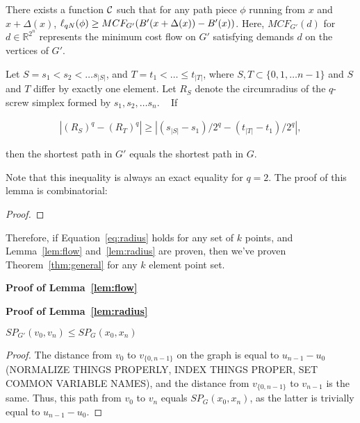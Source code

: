 
\begin{lemma}\label{lem:flow} There exists a function $\mathcal{C}$ such that for
any
path piece $\phi$ running from $x$ and $x+\Delta(x)$, $\ell_{qN}(\phi) \geq
MCF_{G'}(B'(x+\Delta(x))-B'(x))$. Here, $MCF_{G'}(d)$ for $d \in
\mathbb{R}^{2^n}$ represents the minimum cost flow on $G'$ satisfying demands
$d$ on the vertices of $G'$.

\end{lemma}

\begin{lemma}\label{lem:radius} Let $S = s_1 < s_2 < \ldots s_{|S|}$, and $T =
t_1 < \ldots \leq t_{|T|}$, where $S, T \subset \{0,1,\ldots n-1\}$ and $S$ and
$T$ differ by exactly one element. Let $R_S$ denote the circumradius of the
$q$-screw simplex formed by $s_1, s_2, \ldots s_n$. ~ If

\begin{align}\label{eq:radius} |(R_{S})^q-(R_{T})^q| \geq
|(s_{|S|}-s_1)/2^q-(t_{|T|}-t_1)/2^q|, \end{align}

then the shortest path in $G'$ equals the shortest path in $G$.

\end{lemma}

Note that this inequality is always an exact equality for $q=2$. The proof of
this lemma is combinatorial:

\begin{proof}

\end{proof}

Therefore, if Equation~\ref{eq:radius} holds for any set of $k$ points, and
Lemma~\ref{lem:flow} and~\ref{lem:radius} are proven, then we've proven
Theorem~\ref{thm:general} for any $k$ element point set.

\textbf{Proof of Lemma~\ref{lem:flow}}

\textbf{Proof of Lemma~\ref{lem:radius}}

\begin{lemma} $SP_{G'}(v_0, v_n) \leq SP_G(x_0, x_n)$

\end{lemma}

\begin{proof}

The distance from $v_0$ to $v_{\{0,n-1\}}$ on the graph is equal to
$u_{n-1}-u_0$ (NORMALIZE THINGS PROPERLY, INDEX THINGS PROPER, SET COMMON
VARIABLE NAMES), and the distance from $v_{\{0, n-1\}}$ to $v_{n-1}$ is the
same. Thus, this path from $v_0$ to $v_n$ equals $SP_G(x_0, x_n)$, as the
latter is trivially equal to $u_{n-1} - u_0$.

\end{proof}

